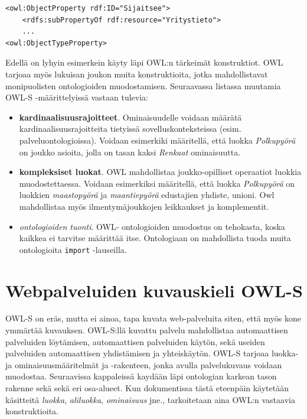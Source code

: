 \documentclass[finnish]{tktltiki2}
\theoremstyle{definition}
\theoremstyle{remark}
\begin{document}
\begin{verbatim}
<owl:ObjectProperty rdf:ID="Sijaitsee">
    <rdfs:subPropertyOf rdf:resource="Yritystieto">
    ...
<owl:ObjectTypeProperty>
\end{verbatim}

Edellä on lyhyin esimerkein käyty läpi OWL:n tärkeimät konstruktiot. OWL tarjoaa myös lukuisan joukon muita konstruktioita, jotka mahdollistavat monipuolisten ontologioiden muodostamisen. Seuraavassa listassa muutamia OWL-S -määrittelyissä vastaan tulevia:

\begin{itemize}
 \item \textbf{kardinaalisuusrajoitteet}. Ominaisuudelle voidaan määrätä kardinaalisuusrajoitteita tietyissä sovelluskonteksteissa (esim. palveluontologioissa)\cite{owlguide}. Voidaan esimerkiki määritellä, että luokka \textit{Polkupyörä} on joukko asioita, jolla on tasan kaksi \textit{Renkaat} ominaisuutta.
  \item \textbf{kompleksiset luokat}. OWL mahdollistaa joukko-opilliset operaatiot luokkia muodostettaessa\cite{owlguide}. Voidaan esimerkiksi määritellä, että luokka \textit{Polkupyörä} on luokkien \textit{maastopyörä} ja \textit{maantiepyörä} edustajien yhdiste, unioni. Owl mahdollistaa myös ilmentymäjoukkojen leikkaukset ja komplementit. 
\item \textit{ontologioiden tuonti}. OWL- ontologioiden muodostus on tehokasta, koska kaikkea ei tarvitse määrittää itse. Ontologiaan on mahdollista tuoda muita ontologioita \texttt{import} -lauseilla\cite{owlguide}. 
\end{itemize}

\section{Webpalveluiden kuvauskieli OWL-S}

OWL-S on eräs, mutta ei ainoa, tapa kuvata web-palveluita siten, että myös kone ymmärtää kuvauksen\cite{OWLS}. OWL-S:llä kuvattu palvelu mahdollistaa  automaattisen palveluiden löytämisen, automaattisen palveluiden käytön, sekä useiden palveluiden automaattisen yhdistämisen ja yhteiskäytön\cite{OWLS}. OWL-S tarjoaa luokka- ja ominaisuusmääritelmät ja -rakenteen, jonka avulla palvelukuvaus voidaan muodostaa. Seuraavissa kappaleissä kaydään läpi ontologian karkean tason rakenne sekä sekä eri osa-alueet. Kun dokumentissa tästä eteenpäin käytetään käsitteitä \textit{luokka}, \textit{aliluokka}, \textit{ominaisuus} jne., tarkoitetaan aina OWL:n vastaavia konstruktioita.
\end{document}
